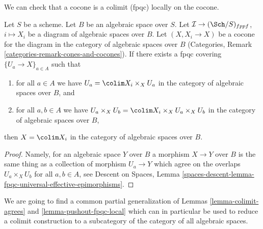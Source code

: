 \noindent
We can check that a cocone is a colimit (fpqc) locally on the cocone.

\begin{lemma}
\label{lemma-pushout-fpqc-local}
Let $S$ be a scheme. Let $B$ be an algebraic space over $S$.
Let $\mathcal{I} \to (\Sch/S)_{fppf}$, $i \mapsto X_i$
be a diagram of algebraic spaces over $B$. Let $(X, X_i \to X)$
be a cocone for the diagram in the category of algebraic spaces over $B$
(Categories, Remark \ref{categories-remark-cones-and-cocones}).
If there exists a fpqc covering $\{U_a \to X\}_{a \in A}$ such that
\begin{enumerate}
\item for all $a \in A$ we have
$U_a = \colim X_i \times_X U_a$
in the category of algebraic spaces over $B$, and
\item for all $a, b \in A$ we have
$U_a \times_X U_b = \colim X_i \times_X U_a \times_X U_b$
in the category of algebraic spaces over $B$,
\end{enumerate}
then $X = \colim X_i$ in the category of algebraic spaces over $B$.
\end{lemma}

\begin{proof}
Namely, for an algebraic space $Y$ over $B$ a morphism $X \to Y$ over $B$
is the same thing as a collection of morphism $U_a \to Y$ which agree on
the overlaps $U_a \times_X U_b$ for all $a, b \in A$, see
Descent on Spaces, Lemma
\ref{spaces-descent-lemma-fpqc-universal-effective-epimorphisms}.
\end{proof}

\noindent
We are going to find a common partial generalization of
Lemmas \ref{lemma-colimit-agrees} and \ref{lemma-pushout-fpqc-local}
which can in particular be used to reduce a colimit construction to a
subcategory of the category of all algebraic spaces.

